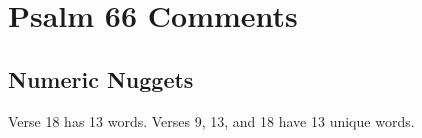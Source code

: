 \section{Psalm 66 Comments}

\subsection{Numeric Nuggets}
Verse 18 has 13 words.  Verses 9, 13, and 18 have 13 unique words.